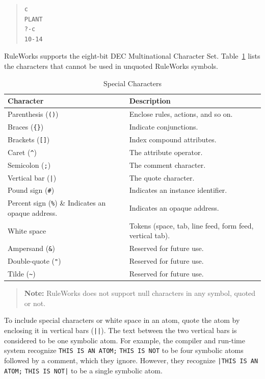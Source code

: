 \begin{quote}
\begin{verbatim}
c
PLANT
?-c
10-14
\end{verbatim}
\end{quote}

RuleWorks supports the eight-bit DEC Multinational Character
Set. Table~\ref{t:2-3} lists the characters that cannot be used in
unquoted RuleWorks symbols.

\begin{table}[h]
  \centering
  \begin{tabular}{ll}
    \toprule
    Character & Description \\
    \midrule
    Parenthesis (\verb|()|) & Enclose rules, actions, and so on. \\
    Braces (\verb|{}|) & Indicate conjunctions. \\
    Brackets (\verb|[]|) & Index compound attributes. \\
    Caret (\verb|^|) & The attribute operator. \\
    Semicolon (\verb|;|) & The comment character. \\
    Vertical bar (\verb,|,) & The quote character. \\
    Pound sign (\verb|#|)  & Indicates an instance identifier. \\
    Percent sign (\verb|%|) & Indicates an opaque address. \\
    White space & Tokens (space, tab, line feed, form feed, vertical tab). \\
    Ampersand (\verb|&|) & Reserved for future use.  \\
    Double-quote (\verb|"|) & Reserved for future use. \\
    Tilde (\verb|~|) & Reserved for future use. \\
    \bottomrule
  \end{tabular}
  \caption{Special Characters}
  \label{t:2-3}
\end{table}

\begin{quote}
  \textbf{Note:} RuleWorks does not support null characters in any
  symbol, quoted or not.
\end{quote}

To include special characters or white space in an atom, quote the
atom by enclosing it in vertical bars (\verb,||,). The text between
the two vertical bars is considered to be one symbolic atom. For
example, the compiler and run-time system recognize
\verb|THIS IS AN ATOM;| \verb|THIS IS NOT| to be four symbolic atoms followed
by a comment, which they ignore. However, they recognize
\verb,|THIS IS AN ATOM;, \verb,THIS IS NOT|, to be a single symbolic
atom.

